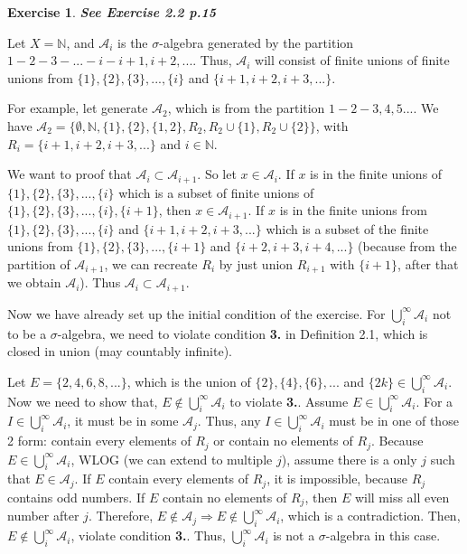 \documentclass[11pt,a4paper]{article}
\theoremstyle{definition}
\newtheorem{exercise}[definition]{Exercise}
\theoremstyle{plain}
\newcommand{\N}{\mathbb{N}}
\newcommand{\A}{\mathcal{A}}
\begin{document}
\begin{exercise}
\textbf{\textit{See Exercise 2.2 p.15}}

Let $X = \N$, and $\A_i$ is the $\sigma$-algebra generated by the partition $1-2-3-...-i-i+1,i+2,...$. Thus, $\A_i$ will consist of finite unions of finite unions from $\{1\}, \{2\}, \{3\},...,\{i\}$ and $\{i+1,i+2,i+3,...\}$.

For example, let generate $\A_2$, which is from the partition $1-2-3,4,5...$. We have $\A_2=\{\emptyset, \N, \{1\}, \{2\}, \{1,2\}, R_2, R_2\cup \{1\}, R_2\cup \{2\}\}$, with $R_i = \{i+1,i+2,i+3,...\}$ and $i \in \N$.

We want to proof that $\A_i \subset \A_{i+1}$. So let $x \in \A_i$. If $x$ is in the finite unions of $\{1\}, \{2\}, \{3\},...,\{i\}$ which is a subset of finite unions of $\{1\}, \{2\}, \{3\},...,\{i\}, \{i+1\}$, then $x \in \A_{i+1}$. If $x$ is in the finite unions from $\{1\}, \{2\}, \{3\},...,\{i\}$ and $\{i+1,i+2,i+3,...\}$ which is a subset of the finite unions from $\{1\}, \{2\}, \{3\},...,\{i+1\}$ and $\{i+2,i+3,i+4,...\}$ (because from the partition of $\A_{i+1}$, we can recreate $R_i$ by just union $R_{i+1}$ with $\{i+1\}$, after that we obtain $\A_{i}$). Thus $\A_{i}\subset \A_{i+1}$.

Now we have already set up the initial condition of the exercise. For $\bigcup_i^{\infty}\A_i$ not to be a $\sigma$-algebra, we need to violate condition \textbf{3.} in Definition 2.1, which is closed in union (may countably infinite).

Let $E= \{2,4,6,8,...\}$, which is the union of $\{2\}, \{4\},\{6\},...$ and $\{2k\} \in \bigcup_i^{\infty}\A_i$. Now we need to show that, $E \not\in \bigcup_i^{\infty}\A_i$ to violate \textbf{3.}. Assume $E \in \bigcup_i^{\infty}\A_i$. For a $I \in \bigcup_i^{\infty}\A_i$, it must be in some $\A_j$. Thus, any $I \in \bigcup_i^{\infty}\A_i$ must be in one of those 2 form: contain every elements of $R_j$ or contain no elements of $R_j$. Because $E \in \bigcup_i^{\infty}\A_i$, WLOG (we can extend to multiple $j$), assume there is a only $j$ such that $E \in \A_j$. If $E$ contain every elements of $R_j$, it is impossible, because $R_j$ contains odd numbers. If $E$ contain no elements of $R_j$, then $E$ will miss all even number after $j$. Therefore, $E \not\in \A_j \Rightarrow E \not\in \bigcup_i^{\infty}\A_i$, which is a contradiction. Then, $ E \not\in \bigcup_i^{\infty}\A_i$, violate condition \textbf{3.}. Thus, $\bigcup_i^{\infty}\A_i$ is not a $\sigma$-algebra in this case.
\end{exercise}
\end{document}
